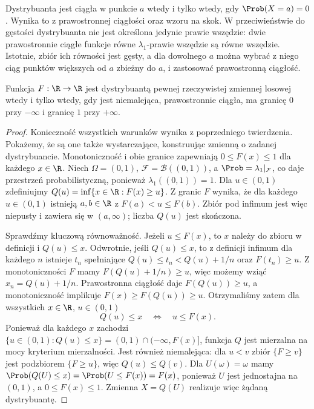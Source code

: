 \begin{wniosek}
Dystrybuanta jest ciągła w punkcie $a$ wtedy i tylko wtedy,
gdy $\Prob(X=a)=0$. Wynika to z prawostronnej ciągłości oraz wzoru na skok.
W przeciwieństwie do gęstości dystrybuanta nie jest określona
jedynie prawie wszędzie: dwie prawostronnie ciągłe funkcje
równe $\lambda_1$-prawie wszędzie są równe wszędzie.
Istotnie, zbiór ich równości jest gęsty, a dla dowolnego $a$
można wybrać z niego ciąg punktów większych od $a$ zbieżny do $a$,
i zastosować prawostronną ciągłość.
\end{wniosek}

\begin{twierdzenie}
Funkcja $F:\R\to\R$ jest dystrybuantą pewnej rzeczywistej
zmiennej losowej wtedy i tylko wtedy, gdy jest niemalejąca,
prawostronnie ciągła, ma granicę $0$ przy $-\infty$
i granicę $1$ przy $+\infty$.
\end{twierdzenie}
\begin{proof}
Konieczność wszystkich warunków wynika z poprzedniego
twierdzenia. Pokażemy, że są one także wystarczające,
konstruując zmienną o zadanej dystrybuancie.
Monotoniczność i obie granice zapewniają $0\leq F(x)\leq1$
dla każdego $x\in\R$.
Niech $\Omega=(0,1)$, $\mathcal F=\mathcal B((0,1))$,
a $\Prob=\lambda_1|_{\mathcal F}$, co daje przestrzeń
probabilistyczną, ponieważ $\lambda_1((0,1))=1$.
Dla $u\in(0,1)$ zdefiniujmy
$Q(u)=\inf\{x\in\R:F(x)\geq u\}$.
Z granic $F$ wynika, że dla każdego $u\in(0,1)$
istnieją $a,b\in\R$ z $F(a)<u\leq F(b)$.
Zbiór pod infimum jest więc niepusty i zawiera się
w $(a,\infty)$; liczba $Q(u)$ jest skończona.

Sprawdźmy kluczową równoważność. Jeżeli $u\leq F(x)$,
to $x$ należy do zbioru w definicji i $Q(u)\leq x$.
Odwrotnie, jeśli $Q(u)\leq x$, to z definicji infimum
dla każdego $n$ istnieje $t_n$ spełniające
$Q(u)\leq t_n<Q(u)+1/n$ oraz $F(t_n)\geq u$.
Z monotoniczności $F$ mamy $F(Q(u)+1/n)\geq u$,
więc możemy wziąć $x_n=Q(u)+1/n$. Prawostronna ciągłość daje
$F(Q(u))\geq u$, a monotoniczność implikuje
$F(x)\geq F(Q(u))\geq u$.
Otrzymaliśmy zatem dla wszystkich $x\in\R$, $u\in(0,1)$
\[
Q(u)\leq x\quad\Longleftrightarrow\quad u\leq F(x).
\]
Ponieważ dla każdego $x$ zachodzi
$\{u\in(0,1):Q(u)\leq x\}=(0,1)\cap(-\infty,F(x)]$,
funkcja $Q$ jest mierzalna na mocy kryterium mierzalności.
Jest również niemalejąca: dla $u<v$ zbiór $\{F\geq v\}$
jest podzbiorem $\{F\geq u\}$, więc $Q(u)\leq Q(v)$.
Dla $U(\omega)=\omega$ mamy
$\Prob(Q(U)\leq x)=\Prob(U\leq F(x))=F(x)$,
ponieważ $U$ jest jednostajna na $(0,1)$, a $0\leq F(x)\leq1$.
Zmienna $X=Q(U)$ realizuje więc żądaną dystrybuantę.
\end{proof}

